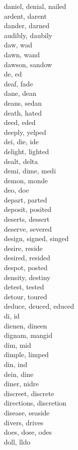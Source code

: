 daniel, denial, nailed\\
ardent, darent\\
dander, darned\\
audibly, daubily\\
daw, wad\\
dawn, wand\\
dawson, sandow\\
de, ed\\
deaf, fade\\
dane, dean\\
deans, sedan\\
death, hated\\
deed, eded\\
deeply, yelped\\
dei, die, ide\\
delight, lighted\\
dealt, delta\\
demi, dime, medi\\
demon, monde\\
deo, doe\\
depart, parted\\
deposit, posited\\
deserts, dessert\\
deserve, severed\\
design, signed, singed\\
desire, reside\\
desired, resided\\
despot, posted\\
density, destiny\\
detest, tested\\
detour, toured\\
deduce, deuced, educed\\
di, id\\
dienen, dineen\\
dignam, mangid\\
dim, mid\\
dimple, limped\\
din, ind\\
dein, dine\\
diner, nidre\\
discreet, discrete\\
directions, discretion\\
disease, seaside\\
divers, drives\\
does, dose, odes\\
doll, lldo\\
